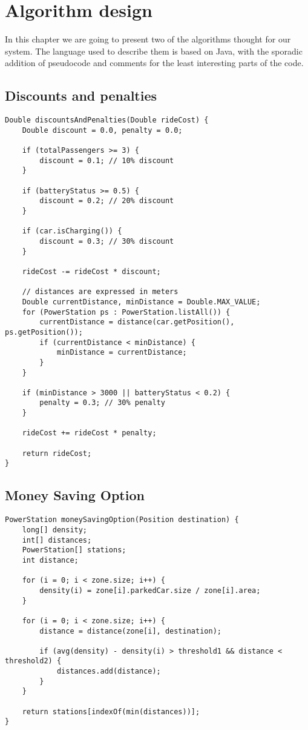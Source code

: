 \chapter{Algorithm design}

In this chapter we are going to present two of the algorithms thought for our system. The language used to describe them is based on Java, with the sporadic addition of pseudocode and comments for the least interesting parts of the code.

\section{Discounts and penalties}
\begin{verbatim}
Double discountsAndPenalties(Double rideCost) {
	Double discount = 0.0, penalty = 0.0;
	
	if (totalPassengers >= 3) {
		discount = 0.1; // 10% discount
	}
	
	if (batteryStatus >= 0.5) {
		discount = 0.2; // 20% discount
	}
	
	if (car.isCharging()) {
		discount = 0.3; // 30% discount
	}
	
	rideCost -= rideCost * discount;
	
	// distances are expressed in meters
	Double currentDistance, minDistance = Double.MAX_VALUE;
	for (PowerStation ps : PowerStation.listAll()) {
		currentDistance = distance(car.getPosition(), ps.getPosition());
		if (currentDistance < minDistance) {
			minDistance = currentDistance;
		}
	}
	
	if (minDistance > 3000 || batteryStatus < 0.2) {
		penalty = 0.3; // 30% penalty
	}
	
	rideCost += rideCost * penalty;
	
	return rideCost;
}
\end{verbatim}

\section{Money Saving Option}
\begin{verbatim}
PowerStation moneySavingOption(Position destination) {
	long[] density;
	int[] distances;
	PowerStation[] stations;
	int distance;
	
	for (i = 0; i < zone.size; i++) {
		density(i) = zone[i].parkedCar.size / zone[i].area;
	}
	
	for (i = 0; i < zone.size; i++) {
		distance = distance(zone[i], destination);
		
		if (avg(density) - density(i) > threshold1 && distance < threshold2) {
			distances.add(distance);
		}
	}
	
	return stations[indexOf(min(distances))];
}
\end{verbatim}